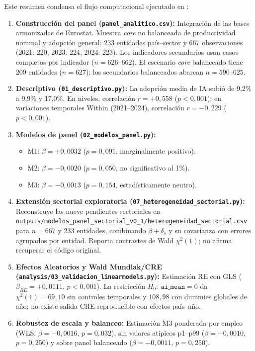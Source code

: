 \documentclass[11pt,a4paper]{article}
\begin{document}
Este resumen condensa el flujo computacional ejecutado en :
\begin{enumerate}[leftmargin=1.5em,itemsep=0.2em]
  \item \textbf{Construcción del panel (\texttt{panel\_analitico.csv}):} Integración de las bases armonizadas de Eurostat. Muestra \textit{core} no balanceada de productividad nominal y adopción general: 233 entidades país--sector y 667 observaciones (2021: 220, 2023: 224, 2024: 223). Los indicadores secundarios usan casos completos por indicador ($n=626\text{--}662$). El escenario \textit{core} balanceado tiene 209 entidades ($n=627$); los secundarios balanceados abarcan $n=590\text{--}625$.
  \item \textbf{Descriptivo (\texttt{01\_descriptivo.py}):} La adopción media de IA subió de 9,2\% a 9,9\% y 17,0\%. En niveles, correlación $r = +0{,}558$ ($p < 0{,}001$); en variaciones temporales Within (2021--2024), correlación $r = -0{,}229$ ($p < 0{,}001$).
  \item \textbf{Modelos de panel (\texttt{02\_modelos\_panel.py}):}
  \begin{itemize}[itemsep=0.1em]
    \item M1: $\beta = +0{,}0032$ ($p = 0{,}091$, marginalmente positivo).
    \item M2: $\beta = -0{,}0020$ ($p = 0{,}050$, no significativo al 1\%).
    \item M3: $\beta = -0{,}0013$ ($p = 0{,}154$, estadísticamente neutro).
  \end{itemize}
  \item \textbf{Extensión sectorial exploratoria (\texttt{07\_heterogeneidad\_sectorial.py}):} Reconstruye las nueve pendientes sectoriales en \texttt{outputs/modelos\_panel\_sectorial\_v0\_1/heterogeneidad\_sectorial.csv} para $n=667$ y 233 entidades, combinando $\beta+\delta_s$ y su covarianza con errores agrupados por entidad. Reporta contrastes de Wald $\chi^2(1)$; no afirma recuperar el código original.
  \item \textbf{Efectos Aleatorios y Wald Mundlak/CRE (\texttt{analysis/03\_validacion\_linearmodels.py}):} Estimación RE con GLS ($\beta_{RE}=+0{,}0111$, $p<0{,}001$). La restricción $H_0:\ \texttt{ai\_mean}=0$ da $\chi^2(1)=69{,}10$ sin controles temporales y $108{,}98$ con dummies globales de año; no existe salida CRE reproducible con efectos país--año.
  \item \textbf{Robustez de escala y balanceo:} Estimación M3 ponderada por empleo (WLS: $\beta = -0{,}0016$, $p = 0{,}032$), sin valores atípicos p1--p99 ($\beta = -0{,}0010$, $p = 0{,}250$) y sobre panel balanceado ($\beta = -0{,}0011$, $p = 0{,}250$).
\end{enumerate}
\end{document}
